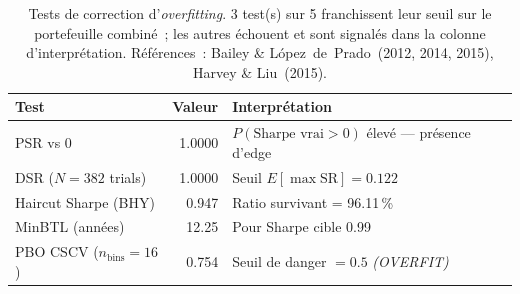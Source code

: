\begin{table}[H]
\centering
\caption{Tests de correction d'\textit{overfitting}. 3 test(s) sur 5 franchissent leur seuil sur le portefeuille combiné~; les autres échouent et sont signalés dans la colonne d'interprétation. Références~: Bailey \& L\'opez~de~Prado~(2012, 2014, 2015), Harvey \& Liu~(2015).}
\label{tab:robustness_overfitting}
\begin{tabular}{lrl}
\toprule
Test & Valeur & Interprétation \\
\midrule
PSR vs 0 & 1.0000 & $P(\text{Sharpe vrai} > 0)$ élevé --- présence d'edge \\
DSR ($N = 382$ trials) & 1.0000 & Seuil $E[\max\mathrm{SR}] = 0.122$ \\
Haircut Sharpe (BHY) & 0.947 & Ratio survivant = 96.11\,\% \\
MinBTL (années) & 12.25 & Pour Sharpe cible 0.99 \\
PBO CSCV ($n_{\text{bins}} = 16$) & 0.754 & Seuil de danger $= 0.5$ \textit{ (OVERFIT)} \\
\bottomrule
\end{tabular}
\end{table}
